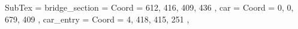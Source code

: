 SubTex = {
	bridge_section								= { Coord = { 612, 416, 409, 436 } },
	car								= { Coord = { 0, 0, 679, 409 } },
	car_entry								= { Coord = { 4, 418, 415, 251 } },
}
